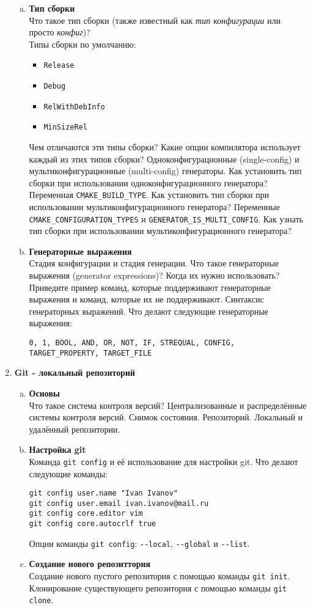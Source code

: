 \documentclass{article}
\begin{document}
\begin{enumerate}
\begin{enumerate}[a.]
\item \textbf{Тип сборки}\\
Что такое тип сборки (также известный как \textit{тип конфигурации} или просто \textit{конфиг})?\\
Типы сборки по умолчанию:
\begin{itemize}
\item \texttt{Release}
\item \texttt{Debug}
\item \texttt{RelWithDebInfo}
\item \texttt{MinSizeRel}
\end{itemize}
Чем отличаются эти типы сборки? Какие опции компилятора использует каждый из этих типов сборки?
Одноконфигурационные (single-config) и мультиконфигурационные (multi-config) генераторы. Как установить тип сборки при использовании одноконфигурационного генератора? Переменная \texttt{CMAKE\_BUILD\_TYPE}. Как установить тип сборки при использовании мультиконфигурационного генератора? Переменные \texttt{CMAKE\_CONFIGURATION\_TYPES} и \texttt{GENERATOR\_IS\_MULTI\_CONFIG}. Как узнать тип сборки при использовании мультиконфигурационного генератора?


\item \textbf{Генераторные выражения}\\
Стадия конфигурации и стадия генерации. Что такое генераторные выражения (generator expressions)? Когда их нужно использовать?
Приведите пример команд, которые поддерживают генераторные выражения и команд, которые их не поддерживают.
Синтаксис генераторных выражений. Что делают следующие генераторные выражения:
\begin{verbatim}
0, 1, BOOL, AND, OR, NOT, IF, STREQUAL, CONFIG, TARGET_PROPERTY, TARGET_FILE
\end{verbatim}

\end{enumerate}


\item \textbf{Git - локальный репозиторий}

\begin{enumerate}[a.]
\item \textbf{Основы}\\
Что такое система контроля версий? Централизованные и распределённые системы контроля версий. Снимок состояния. Репозиторий. Локальный и удалённый репозитории.
\item \textbf{Настройка git}\\
Команда \texttt{git config} и её использование для настройки git. Что делают следующие команды:
\begin{lstlisting}
git config user.name "Ivan Ivanov"
git config user.email ivan.ivanov@mail.ru
git config core.editor vim
git config core.autocrlf true
\end{lstlisting}
Опции команды \texttt{git config}: \texttt{-{}-local}, \texttt{-{}-global} и \texttt{-{}-list}.
\item \textbf{Создание нового репозиттория}\\
Создание нового пустого репозитория с помощью команды \texttt{git init}. Клонирование существующего репозитория с помощью команды \texttt{git clone}.


\end{enumerate}
\end{enumerate}
\end{document}

